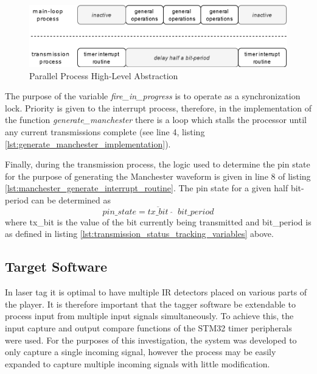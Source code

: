 \begin{figure}[H]
	\centering
	\includegraphics[width=0.8\linewidth]{figures/design/parallel_process_transmission.png}
	\caption{Parallel Process High-Level Abstraction}
	\label{fig:parallel_process_abstraction}
\end{figure}

The purpose of the variable \textit{fire\_in\_progress} is to operate as a synchronization lock. Priority is given to the interrupt process, therefore, in the implementation of the function \textit{generate\_manchester} there is a loop which stalls the processor until any current transmissions complete (see line 4, listing \ref{lst:generate_manchester_implementation}).

Finally, during the transmission process, the logic used to determine the pin state for the purpose of generating the Manchester waveform is given in line 8 of listing \ref{lst:manchester_generate_interrupt_routine}. The pin state for a given half bit-period can be determined as \[pin\_state = \overline{tx\_bit} \;\; \widehat{} \;\; bit\_period\] where tx\_bit is the value of the bit currently being transmitted and bit\_period is as defined in listing \ref{lst:transmission_status_tracking_variables} above.








\subsection{Target Software}

In laser tag it is optimal to have multiple IR detectors placed on various parts of the player. It is therefore important that the tagger software be extendable to process input from multiple input signals simultaneously. To achieve this, the input capture and output compare functions of the STM32 timer peripherals were used. For the purposes of this investigation, the system was developed to only capture a single incoming signal, however the process may be easily expanded to capture multiple incoming signals with little modification.

